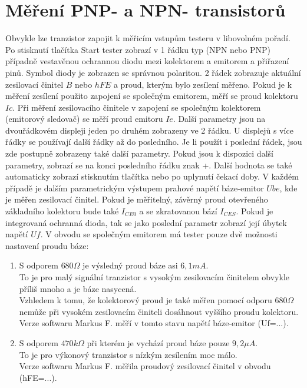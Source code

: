 \section{Měření PNP- a NPN- transistorů}
Obvykle lze tranzistor zapojit k měřicím vstupům testeru v libovolném pořadí.
Po stisknutí tlačítka Start tester zobrazí v 1 řádku  typ (NPN nebo PNP) případně vestavěnou ochrannou
diodu mezi kolektorem a emitorem a přiřazení pinů.
Symbol diody je zobrazen se správnou polaritou.
2 řádek zobrazuje aktuální zesilovací činitel \(B\) nebo \(hFE\) a proud, kterým bylo zesílení měřeno. 
Pokud je k měření zesílení použito zapojení se společným emitorem, měří se proud kolektoru \(Ic\).
Při měření zesilovacího činitele v zapojení se společným kolektorem (emitorový sledovač)
se měří proud emitoru \(Ie\).
Další parametry jsou na dvouřádkovém displeji jeden po druhém zobrazeny ve 2 řádku.
U displejů s více řádky se používají další řádky až do posledního.
Je li použít i poslední řádek, jsou zde postupně zobrazeny také další parametry.
Pokud jsou k dispozici další parametry, zobrazí se na konci posledního řádku znak +.
Další hodnota se také automaticky zobrazí stisknutím tlačítka nebo po uplynutí čekací doby.
V každém případě je dalším parametrickým výstupem prahové napětí báze-emitor \(Ube\),
kde je měřen zesilovací činitel.
Pokud je měřitelný, závěrný proud otevřeného základního kolektoru bude také \(I_{CE0}\) a se
zkratovanou bází \(I_{CES}\).
Pokud je integrovaná ochranná dioda, tak se jako poslední parametr zobrazí její úbytek napětí \(Uf\).
V obvodu se společným emitorem má tester pouze dvě možnosti nastavení proudu báze:
\begin{enumerate}
\item S odporem \(680\Omega\) je výsledný proud báze asi \(6,1mA\).\\
To je pro malý signální tranzistor s vysokým zesilovacím činitelem obvykle příliš mnoho a je báze nasycená.\\
Vzhledem k tomu, že kolektorový proud je také měřen pomocí odporu \(680\Omega\) nemůže při vysokém zesilovacím činiteli dosáhnout vyššího proudu kolektoru.\\
Verze softwaru Markus F. měří v tomto stavu napětí báze-emitor (Uf=...).
\item S odporem \(470k\Omega\) při kterém je vychází proud báze pouze \(9,2\mu A\).\\
To je pro výkonový tranzistor s nízkým zesílením moc málo.\\
Verze softwaru Markus F. měřila proudový zesilovací činitel v obvodu (hFE=...).\\
\end{enumerate}

